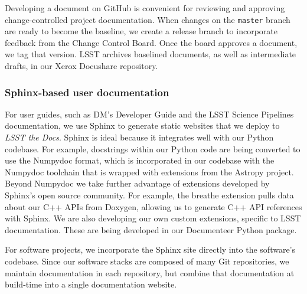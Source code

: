 Developing a document on GitHub is convenient for reviewing and approving change-controlled project documentation.
When changes on the \texttt{master} branch are ready to become the baseline, we create a release branch to incorporate feedback from the Change Control Board.
Once the board approves a document, we tag that version.
LSST archives baselined documents, as well as intermediate drafts, in our Xerox Docushare repository.

\subsubsection{Sphinx-based user documentation}
\label{sec:sphinx_tooling}

For user guides, such as DM's Developer Guide and the LSST Science Pipelines documentation, we use Sphinx to generate static websites that we deploy to \textit{LSST the Docs}.
Sphinx is ideal because it integrates well with our Python codebase.
For example, docstrings within our Python code are being converted to use the Numpydoc\cite{numpydoc} format, which is incorporated in our codebase with the Numpydoc toolchain that is wrapped with extensions from the Astropy\cite{2018arXiv180102634T} project.
Beyond Numpydoc we take further advantage of extensions developed by Sphinx's open source community.
For example, the breathe extension pulls data about our C++ APIs from Doxygen, allowing us to generate C++ API references with Sphinx.
We are also developing our own custom extensions, specific to LSST documentation.
These are being developed in our Documenteer Python package.

For software projects, we incorporate the Sphinx site directly into the software's codebase.
Since our software stacks are composed of many Git repositories, we maintain documentation in each repository, but combine that documentation at build-time into a single documentation website.
